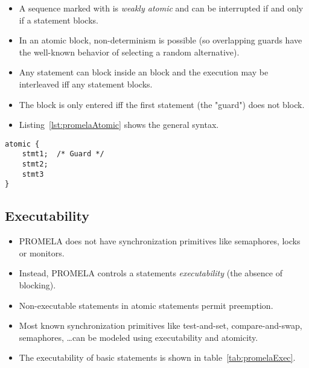 				\begin{itemize}
					\item A sequence marked with  is \textit{weakly atomic} and can be interrupted if and only if a statement blocks.
					\item In an atomic block, non-determinism is possible (so overlapping guards have the well-known behavior of selecting a random alternative).
					\item Any statement can block inside an  block and the execution may be interleaved iff any statement blocks.
					\item The block is only entered iff the first statement (the "guard") does not block.
					\item Listing~\ref{lst:promelaAtomic} shows the general syntax.
				\end{itemize}
			
				\begin{lstlisting}[caption = { Atomic Sequence in PROMELA }, label = lst:promelaAtomic, language = PROMELA]
atomic {
	stmt1;  /* Guard */
	stmt2;
	stmt3
}
				\end{lstlisting}

		\subsection{Executability} %
			\label{sec:promelaExec}
		
			\begin{itemize}
				\item PROMELA does not have synchronization primitives like semaphores, locks or monitors.
				\item Instead, PROMELA controls a statements \textit{executability} (the absence of blocking).
				\item Non-executable statements in atomic statements permit preemption.
				\item Most known synchronization primitives like test-and-set, compare-and-swap, semaphores, \dots can be modeled using executability and atomicity.
				\item The executability of basic statements is shown in table~\ref{tab:promelaExec}.
			\end{itemize}
		
